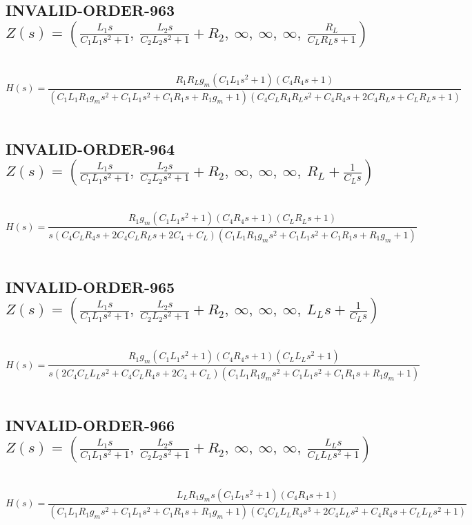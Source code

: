 \documentclass{article}
\begin{document}
\subsection{INVALID-ORDER-963 $Z(s) = \left( \frac{L_{1} s}{C_{1} L_{1} s^{2} + 1}, \  \frac{L_{2} s}{C_{2} L_{2} s^{2} + 1} + R_{2}, \  \infty, \  \infty, \  \infty, \  \frac{R_{L}}{C_{L} R_{L} s + 1}\right)$ } \ 
\textbf{\[H(s) = \frac{R_{1} R_{L} g_{m} \left(C_{1} L_{1} s^{2} + 1\right) \left(C_{4} R_{4} s + 1\right)}{\left(C_{1} L_{1} R_{1} g_{m} s^{2} + C_{1} L_{1} s^{2} + C_{1} R_{1} s + R_{1} g_{m} + 1\right) \left(C_{4} C_{L} R_{4} R_{L} s^{2} + C_{4} R_{4} s + 2 C_{4} R_{L} s + C_{L} R_{L} s + 1\right)}\] } \ 
\subsection{INVALID-ORDER-964 $Z(s) = \left( \frac{L_{1} s}{C_{1} L_{1} s^{2} + 1}, \  \frac{L_{2} s}{C_{2} L_{2} s^{2} + 1} + R_{2}, \  \infty, \  \infty, \  \infty, \  R_{L} + \frac{1}{C_{L} s}\right)$ } \ 
\textbf{\[H(s) = \frac{R_{1} g_{m} \left(C_{1} L_{1} s^{2} + 1\right) \left(C_{4} R_{4} s + 1\right) \left(C_{L} R_{L} s + 1\right)}{s \left(C_{4} C_{L} R_{4} s + 2 C_{4} C_{L} R_{L} s + 2 C_{4} + C_{L}\right) \left(C_{1} L_{1} R_{1} g_{m} s^{2} + C_{1} L_{1} s^{2} + C_{1} R_{1} s + R_{1} g_{m} + 1\right)}\] } \ 
\subsection{INVALID-ORDER-965 $Z(s) = \left( \frac{L_{1} s}{C_{1} L_{1} s^{2} + 1}, \  \frac{L_{2} s}{C_{2} L_{2} s^{2} + 1} + R_{2}, \  \infty, \  \infty, \  \infty, \  L_{L} s + \frac{1}{C_{L} s}\right)$ } \ 
\textbf{\[H(s) = \frac{R_{1} g_{m} \left(C_{1} L_{1} s^{2} + 1\right) \left(C_{4} R_{4} s + 1\right) \left(C_{L} L_{L} s^{2} + 1\right)}{s \left(2 C_{4} C_{L} L_{L} s^{2} + C_{4} C_{L} R_{4} s + 2 C_{4} + C_{L}\right) \left(C_{1} L_{1} R_{1} g_{m} s^{2} + C_{1} L_{1} s^{2} + C_{1} R_{1} s + R_{1} g_{m} + 1\right)}\] } \ 
\subsection{INVALID-ORDER-966 $Z(s) = \left( \frac{L_{1} s}{C_{1} L_{1} s^{2} + 1}, \  \frac{L_{2} s}{C_{2} L_{2} s^{2} + 1} + R_{2}, \  \infty, \  \infty, \  \infty, \  \frac{L_{L} s}{C_{L} L_{L} s^{2} + 1}\right)$ } \ 
\textbf{\[H(s) = \frac{L_{L} R_{1} g_{m} s \left(C_{1} L_{1} s^{2} + 1\right) \left(C_{4} R_{4} s + 1\right)}{\left(C_{1} L_{1} R_{1} g_{m} s^{2} + C_{1} L_{1} s^{2} + C_{1} R_{1} s + R_{1} g_{m} + 1\right) \left(C_{4} C_{L} L_{L} R_{4} s^{3} + 2 C_{4} L_{L} s^{2} + C_{4} R_{4} s + C_{L} L_{L} s^{2} + 1\right)}\] } \ 
\end{document}
